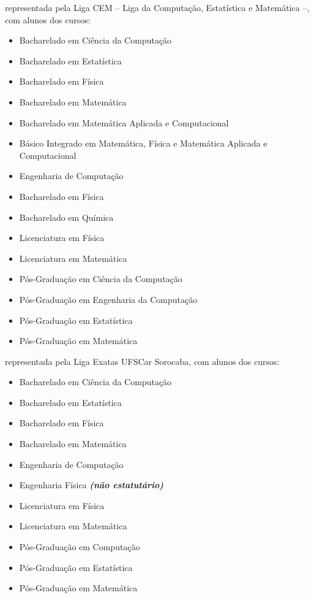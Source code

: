 \begin{article}
\begin{description}[noitemsep]
		\item[UNICAMP - Campinas] representada pela Liga CEM -- Liga da Computação, Estatística e Matemática --, com alunos dos cursos:
		\begin{itemize}[noitemsep]
			\item Bacharelado em Ciência da Computação
			\item Bacharelado em Estatística
			\item Bacharelado em Física
			\item Bacharelado em Matemática
			\item Bacharelado em Matemática Aplicada e Computacional
			\item Básico Integrado em Matemática, Física e Matemática Aplicada e Computacional
			\item Engenharia de Computação
			\item Bacharelado em Física
			\item Bacharelado em Química
			\item Licenciatura em Física
			\item Licenciatura em Matemática
			\item Pós-Graduação em Ciência da Computação
			\item Pós-Graduação em Engenharia da Computação
			\item Pós-Graduação em Estatística
			\item Pós-Graduação em Matemática
		\end{itemize}

		\item[UFSCar - São Carlos] representada pela Liga Exatas UFSCar Sorocaba, com alunos dos cursos:
		\begin{itemize}[noitemsep]
			\item Bacharelado em Ciência da Computação
			\item Bacharelado em Estatística
			\item Bacharelado em Física
			\item Bacharelado em Matemática
			\item Engenharia de Computação
			\item Engenharia Física \textbf{\textit{(não estatutário)}}
			\item Licenciatura em Física
			\item Licenciatura em Matemática
			\item Pós-Graduação em Computação
			\item Pós-Graduação em Estatística
			\item Pós-Graduação em Matemática
		\end{itemize}


\end{description}
\end{article}
